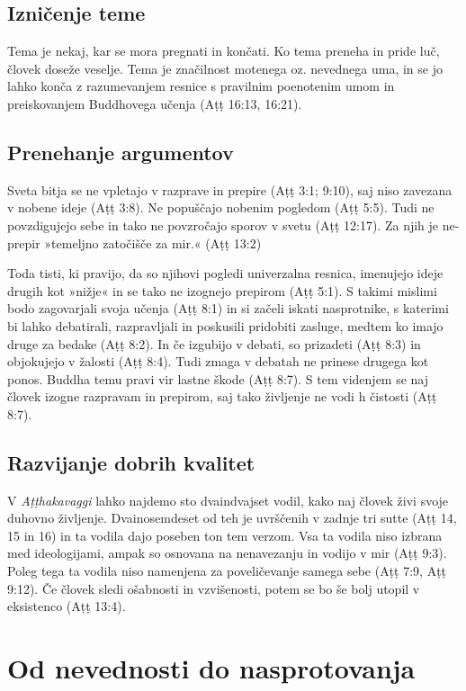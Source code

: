 \subsection{Izničenje teme}

Tema je nekaj, kar se mora pregnati in
končati. Ko tema preneha in pride luč, človek doseže veselje. Tema je
značilnost motenega oz. nevednega uma, in se jo lahko konča z
razumevanjem resnice s pravilnim poenotenim umom in preiskovanjem
Buddhovega učenja (Aṭṭ 16:13, 16:21).

\subsection{Prenehanje argumentov}

Sveta bitja se ne vpletajo v
razprave in prepire (Aṭṭ 3:1; 9:10), saj niso zavezana v nobene ideje
(Aṭṭ 3:8). Ne popuščajo nobenim pogledom (Aṭṭ 5:5). Tudi ne povzdigujejo
sebe in tako ne povzročajo sporov v svetu (Aṭṭ 12:17). Za njih je
ne-prepir »temeljno zatočišče za mir.« (Aṭṭ 13:2)

Toda tisti, ki pravijo, da so njihovi pogledi univerzalna resnica,
imenujejo ideje drugih kot »nižje« in se tako ne izognejo prepirom (Aṭṭ
5:1). S takimi mislimi bodo zagovarjali svoja učenja (Aṭṭ 8:1) in si
začeli iskati nasprotnike, s katerimi bi lahko debatirali, razpravljali
in poskusili pridobiti zasluge, medtem ko imajo druge za bedake (Aṭṭ
8:2). In če izgubijo v debati, so prizadeti (Aṭṭ 8:3) in objokujejo v
žalosti (Aṭṭ 8:4). Tudi zmaga v debatah ne prinese drugega kot ponos.
Buddha temu pravi vir lastne škode (Aṭṭ 8:7). S tem videnjem se naj
človek izogne razpravam in prepirom, saj tako življenje ne vodi h
čistosti (Aṭṭ 8:7).

\subsection{Razvijanje dobrih kvalitet}

V \emph{Aṭṭhakavaggi} lahko
najdemo sto dvaindvajset vodil, kako naj človek živi svoje duhovno
življenje. Dvainosemdeset od teh je uvrščenih v zadnje tri sutte (Aṭṭ
14, 15 in 16) in ta vodila dajo poseben ton tem verzom. Vsa ta vodila
niso izbrana med ideologijami, ampak so osnovana na nenavezanju in
vodijo v mir (Aṭṭ 9:3). Poleg tega ta vodila niso namenjena za
poveličevanje samega sebe (Aṭṭ 7:9, Aṭṭ 9:12). Če človek sledi ošabnosti
in vzvišenosti, potem se bo še bolj utopil v eksistenco (Aṭṭ 13:4).

\section{Od nevednosti do nasprotovanja}

